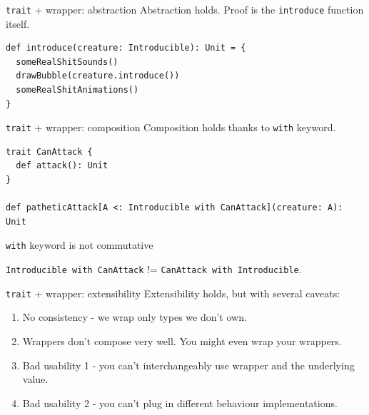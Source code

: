 \documentclass[presentation,aspectratio=169,smaller]{beamer}
\begin{document}
\begin{frame}[label={sec:org2a182bc},fragile]{\texttt{trait} + wrapper: abstraction}
 Abstraction holds. Proof is the \texttt{introduce} function itself.

\begin{verbatim}
def introduce(creature: Introducible): Unit = {
  someRealShitSounds()
  drawBubble(creature.introduce())
  someRealShitAnimations()
}
\end{verbatim}
\end{frame}

\begin{frame}[label={sec:org7604093},fragile]{\texttt{trait} + wrapper: composition}
 Composition holds thanks to \texttt{with} keyword.

\pause

\begin{verbatim}
trait CanAttack {
  def attack(): Unit
}

def patheticAttack[A <: Introducible with CanAttack](creature: A): Unit
\end{verbatim}

\pause

\texttt{with} keyword is not commutative

\texttt{Introducible with CanAttack} != \texttt{CanAttack with Introducible}.
\end{frame}

\begin{frame}[label={sec:org94a3aec},fragile]{\texttt{trait} + wrapper: extensibility}
 Extensibility holds, but with several caveats:

\begin{enumerate}
\item No consistency - we wrap only types we don't own.
\item Wrappers don't compose very well. You might even wrap your wrappers.
\item Bad usability 1 - you can’t interchangeably use wrapper and the underlying
value.
\item Bad usability 2 - you can't plug in different behaviour implementations.
\end{enumerate}
\end{frame}
\end{document}
